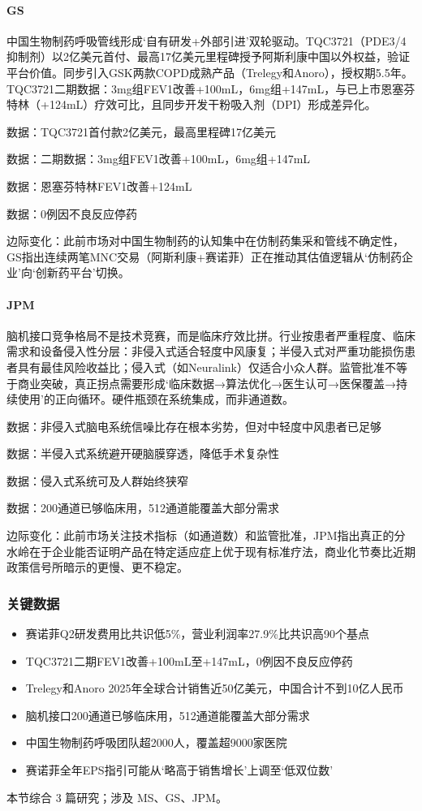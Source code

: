 \documentclass[11pt]{ctexart}
\begin{document}
\paragraph{GS} 中国生物制药呼吸管线形成‘自有研发+外部引进’双轮驱动。TQC3721（PDE3/4抑制剂）以2亿美元首付、最高17亿美元里程碑授予阿斯利康中国以外权益，验证平台价值。同步引入GSK两款COPD成熟产品（Trelegy和Anoro），授权期5.5年。TQC3721二期数据：3mg组FEV1改善+100mL，6mg组+147mL，与已上市恩塞芬特林（+124mL）疗效可比，且同步开发干粉吸入剂（DPI）形成差异化。
{\small\color{refgray}数据：TQC3721首付款2亿美元，最高里程碑17亿美元\par}
{\small\color{refgray}数据：二期数据：3mg组FEV1改善+100mL，6mg组+147mL\par}
{\small\color{refgray}数据：恩塞芬特林FEV1改善+124mL\par}
{\small\color{refgray}数据：0例因不良反应停药\par}
{\small\color{refgray}边际变化：此前市场对中国生物制药的认知集中在仿制药集采和管线不确定性，GS指出连续两笔MNC交易（阿斯利康+赛诺菲）正在推动其估值逻辑从‘仿制药企业’向‘创新药平台’切换。\par}
\paragraph{JPM} 脑机接口竞争格局不是技术竞赛，而是临床疗效比拼。行业按患者严重程度、临床需求和设备侵入性分层：非侵入式适合轻度中风康复；半侵入式对严重功能损伤患者具有最佳风险收益比；侵入式（如Neuralink）仅适合小众人群。监管批准不等于商业突破，真正拐点需要形成‘临床数据→算法优化→医生认可→医保覆盖→持续使用’的正向循环。硬件瓶颈在系统集成，而非通道数。
{\small\color{refgray}数据：非侵入式脑电系统信噪比存在根本劣势，但对中轻度中风患者已足够\par}
{\small\color{refgray}数据：半侵入式系统避开硬脑膜穿透，降低手术复杂性\par}
{\small\color{refgray}数据：侵入式系统可及人群始终狭窄\par}
{\small\color{refgray}数据：200通道已够临床用，512通道能覆盖大部分需求\par}
{\small\color{refgray}边际变化：此前市场关注技术指标（如通道数）和监管批准，JPM指出真正的分水岭在于企业能否证明产品在特定适应症上优于现有标准疗法，商业化节奏比近期政策信号所暗示的更慢、更不稳定。\par}
\subsubsection*{关键数据}
\begin{itemize}
  \item 赛诺菲Q2研发费用比共识低5\%，营业利润率27.9\%比共识高90个基点
  \item TQC3721二期FEV1改善+100mL至+147mL，0例因不良反应停药
  \item Trelegy和Anoro 2025年全球合计销售近50亿美元，中国合计不到10亿人民币
  \item 脑机接口200通道已够临床用，512通道能覆盖大部分需求
  \item 中国生物制药呼吸团队超2000人，覆盖超9000家医院
  \item 赛诺菲全年EPS指引可能从‘略高于销售增长’上调至‘低双位数’
\end{itemize}
{\small\color{refgray}本节综合 3 篇研究；涉及 MS、GS、JPM。}
\newpage
\end{document}
